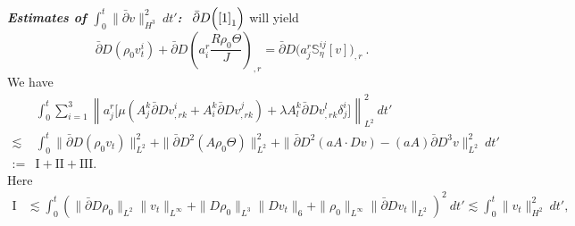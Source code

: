 \documentclass[12pt,a4paper]{amsart}
\numberwithin{equation}{section}
\theoremstyle{plain}
\theoremstyle{definition}
\newcommand{\bpartial}{\bar{\partial}}
\begin{document}
\vspace{0.3cm}


\textsl{\textbf{Estimates of $\int_{0}^{t}\| \bpartial v\|_{H^3}^2\ dt'$:}}~
$\bpartial D \Big(\eqref{1}_1\Big)$ will yield
$$
\bpartial D(\rho_0v^i_{t})+\bpartial D \left(a^r_i \frac{R\rho_0\Theta}{J}\right)_{,r}=\bpartial D \Big(a^r_j \mathbb{S}^{ij}_{\eta}[v]\Big)_{,r} ~.
$$
We have
\begin{align*}
&\int_{0}^{t}\sum\limits_{i=1}^3\left\| a^r_j\Big[\mu (A^{k}_j  \bpartial D v^i_{,rk}+A^k_i\bpartial D v^j_{,rk})+\lambda A_l^k \bpartial D v^l_{,rk}\delta^i_j\Big]   \right\|_{L^2}^2 \ dt'\\
\lesssim & \int_{0}^{t} \|\bpartial D(\rho_0 v_{t})\|_{L^2}^2
 +\| \bpartial D^2(A\rho_0\Theta)\|_{L^2}^2
 +\|\bpartial D^2(a A \cdot Dv)- (aA) \bpartial D^3v\|_{L^2}^2\ dt'\\
:=&\mathrm{I}+\mathrm{II}+\mathrm{III} .
\end{align*}
Here
\begin{align*}
\mathrm{I}&\lesssim \int_{0}^{t} (\|\bpartial D\rho_0\|_{L^2}\|v_{t}\|_{L^{\infty}}
   +\|D\rho_0\|_{L^3}\|D v_t\|_{6}
   +\|\rho_0\|_{L^{\infty}}\|\bpartial Dv_{t}\|_{L^2})^2\ dt' 
   \lesssim  \int_{0}^{t} \|v_{t}\|_{H^2}^2\ dt',
\end{align*}
\end{document}
